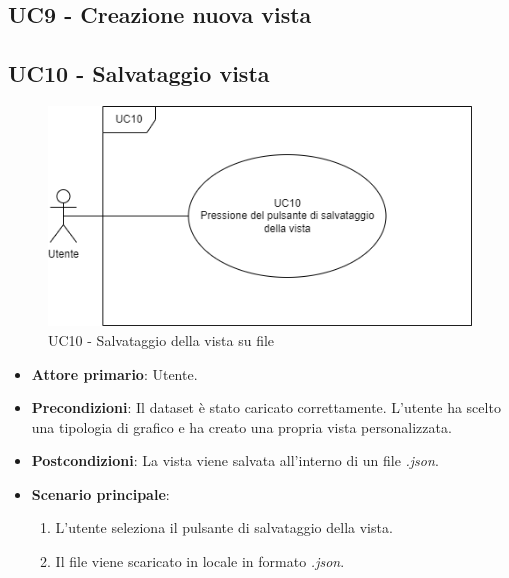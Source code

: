 \newpage

\subsection{UC9 - Creazione nuova vista}


\newpage

\subsection{UC10 - Salvataggio vista}
\label{sec:UC10}
\begin{figure}[h!]
    \centering
    \includegraphics[scale=0.55]{../../assets/salvataggio_vista.png}
    \caption{UC10 - Salvataggio della vista su file}
\end{figure}
\begin{itemize}
    \item \textbf{Attore primario}: Utente.
    \item \textbf{Precondizioni}: Il dataset è stato caricato correttamente. L'utente ha scelto una tipologia di grafico e ha creato una propria vista personalizzata.
    \item \textbf{Postcondizioni}: La vista viene salvata all'interno di un file \textit{.json}.
    \item \textbf{Scenario principale}:
          \begin{enumerate}
              \item L'utente seleziona il pulsante di salvataggio della vista.
              \item Il file viene scaricato in locale in formato \textit{.json}.
          \end{enumerate}
\end{itemize}

